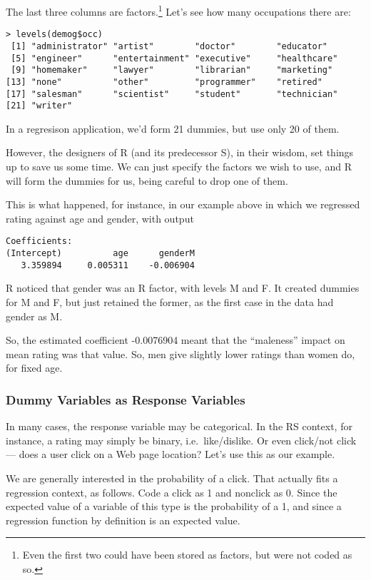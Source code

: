 The last three columns are factors.\footnote{Even the first two could
have been stored as factors, but were not coded as so.}  Let's see how
many occupations there are:

\begin{lstlisting}
> levels(demog$occ)
 [1] "administrator" "artist"        "doctor"        "educator"     
 [5] "engineer"      "entertainment" "executive"     "healthcare"   
 [9] "homemaker"     "lawyer"        "librarian"     "marketing"    
[13] "none"          "other"         "programmer"    "retired"      
[17] "salesman"      "scientist"     "student"       "technician"   
[21] "writer"       
\end{lstlisting}

In a regresison application, we'd form 21 dummies, but use only 20 of
them.

However, the designers of R (and its predecessor S), in their wisdom,
set things up to save us some time.  We can just specify the factors we
wish to use, and R will form the dummies for us, being careful to drop
one of them.

This is what happened, for instance, in our example above in which we
regressed rating against age and gender, with output

\begin{lstlisting}
Coefficients:
(Intercept)          age      genderM  
   3.359894     0.005311    -0.006904  
\end{lstlisting}

R noticed that gender was an R factor, with levels M and F.  It created
dummies for M and F, but just retained the former, as the first case in
the data had gender as M.

So, the estimated coefficient -0.0076904 meant that the ``maleness''
impact on mean rating was that value.  So, men give slightly lower
ratings than women do, for fixed age.

\subsubsection{Dummy Variables as Response Variables}

In many cases, the response variable may be categorical.  In the RS
context, for instance, a rating may simply be binary, i.e.\
like/dislike.  Or even click/not click --- does a user click on a Web page
location?  Let's use this as our example.

We are generally interested in the probability of a click.  That
actually fits a regression context, as follows.  Code a click as 1 and
nonclick as 0.  Since the expected value of a variable of this type is
the probability of a 1, and since a regression function by definition
is an expected value.

